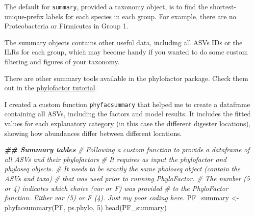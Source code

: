 \documentclass[
]{book}
\newenvironment{Shaded}{\begin{snugshade}}{\end{snugshade}}
\newcommand{\CommentTok}[1]{\textcolor[rgb]{0.56,0.35,0.01}{\textit{#1}}}
\newcommand{\DecValTok}[1]{\textcolor[rgb]{0.00,0.00,0.81}{#1}}
\newcommand{\DocumentationTok}[1]{\textcolor[rgb]{0.56,0.35,0.01}{\textbf{\textit{#1}}}}
\newcommand{\FunctionTok}[1]{\textcolor[rgb]{0.00,0.00,0.00}{#1}}
\newcommand{\NormalTok}[1]{#1}
\newcommand{\OtherTok}[1]{\textcolor[rgb]{0.56,0.35,0.01}{#1}}
\begin{document}
The default for \texttt{summary}, provided a taxonomy object, is to find the shortest-unique-prefix labels for each species in each group. For example, there are no Proteobacteria or Firmicutes in Group 1.

The summary objects contains other useful data, including all ASVs IDs or the ILRs for each group, which may become handy if you wanted to do some custom filtering and figures of your taxonomy.

There are other summary tools available in the phylofactor package. Check them out in the \href{https://docs.wixstatic.com/ugd/0119a1_099ae20df8424af9a38585dcebc0d45a.pdf}{phylofactor tutorial}.

I created a custom function \texttt{phyfacsummary} that helped me to create a dataframe containing all ASVs, including the factors and model results. It includes the fitted values for each explanatory category (in this case the different digester locations), showing how abundances differ between different locations.

\begin{Shaded}
\begin{Highlighting}[]
\DocumentationTok{\#\# Summary tables}
\CommentTok{\# Following a custom function to provide a dataframe of all ASVs and their phylofactors }
\CommentTok{\# It requires as input the phylofactor and phyloseq objects. }
\CommentTok{\# It needs to be exactly the same pholoseq object (contain the ASVs and taxa) }
\CommentTok{\# that was used prior to running PhyloFactor. }
\CommentTok{\# The number (5 or 4) indicates which \textasciigrave{}choice\textasciigrave{} (\textquotesingle{}var\textquotesingle{} or \textquotesingle{}F\textquotesingle{}) was provided }
\CommentTok{\# to the PhyloFactor function. Either \textquotesingle{}var\textquotesingle{} (5) or \textquotesingle{}F\textquotesingle{} (4). Just my poor coding here.   }
\NormalTok{PF\_summary }\OtherTok{\textless{}{-}} \FunctionTok{phyfacsummary}\NormalTok{(PF, ps.phylo, }\DecValTok{5}\NormalTok{)  }
\FunctionTok{head}\NormalTok{(PF\_summary)}
\end{Highlighting}
\end{Shaded}
\end{document}
